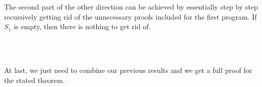 The second part of the other direction can be achieved by essentially step by step recursively getting rid of the unnecessary proofs included for the first program. If $S_{1}$ is empty, then there is nothing to get rid of.

\begin{code}
    \>[2]\AgdaSpace{}%
    \AgdaSymbol{:}\AgdaSpace{}%
    \AgdaSymbol{(}\AgdaSpace{}%
    \AgdaOperator{\AgdaFunction{▷[}}\AgdaSpace{}%
    \AgdaSpace{}%
    \AgdaSpace{}%
    \AgdaSpace{}%
    \AgdaOperator{\AgdaFunction{]}}\AgdaSpace{}%
    \AgdaSymbol{)}\AgdaSpace{}%
    \AgdaSpace{}%
    \AgdaSymbol{(}\AgdaSpace{}%
    \AgdaOperator{\AgdaFunction{▷[}}\AgdaSpace{}%
    \AgdaSpace{}%
    \AgdaOperator{\AgdaFunction{]}}\AgdaSpace{}%
    \AgdaSymbol{)}\<%
    \\
    \>[2]\AgdaSpace{}%
    \AgdaSymbol{\{}\AgdaSpace{}%
    \AgdaSymbol{=}\AgdaSpace{}%
    \AgdaInductiveConstructor{[]}\AgdaSymbol{\}}\AgdaSpace{}%
    \AgdaSpace{}%
    \AgdaSymbol{=}\AgdaSpace{}%
    \<%
    \\
    \>[2]\AgdaSpace{}%
    \AgdaSymbol{\{}\AgdaSpace{}%
    \AgdaSymbol{=}\AgdaSpace{}%
    \AgdaSymbol{\AgdaUnderscore{}}\AgdaSpace{}%
    \AgdaSpace{}%
    \AgdaSymbol{\AgdaUnderscore{}\}}\AgdaSpace{}%
    \AgdaSpace{}%
    \AgdaSymbol{(}\AgdaSpace{}%
    \AgdaOperator{\AgdaInductiveConstructor{,}}\AgdaSpace{}%
    \AgdaSymbol{)}\AgdaSpace{}%
    \AgdaSymbol{=}\AgdaSpace{}%
    \AgdaSpace{}%
    \AgdaSymbol{(}\AgdaSpace{}%
    \AgdaSymbol{)}\AgdaSpace{}%
    \AgdaSymbol{(}\AgdaSpace{}%
    \AgdaOperator{\AgdaInductiveConstructor{,}}\AgdaSpace{}%
    \AgdaSymbol{)}\<%
\end{code}

At last, we just need to combine our previous results and we get a full proof for the stated theorem.

